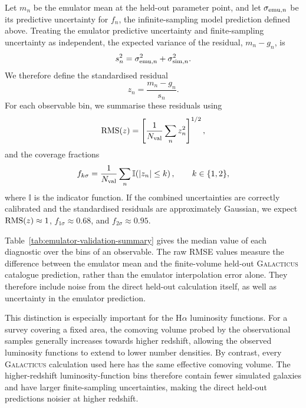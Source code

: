 \documentclass[twocolumn, apj, numberedappendix, iop]{openjournal}
\newcommand{\galacticus}{\textsc{Galacticus}\xspace}
\newcommand{\ha}{H$\alpha$}
\begin{document}
Let $m_n$ be the emulator mean at the held-out parameter point, and let
$\sigma_{{\rm emu},n}$ be its predictive uncertainty for $f_n$, the
infinite-sampling model prediction defined above. Treating the emulator
predictive uncertainty and finite-sampling uncertainty as independent, the
expected variance of the residual, $m_n - g_n$, is
\begin{equation}
  s_n^2
  =
  \sigma_{{\rm emu},n}^2
  +
  \sigma_{{\rm sim},n}^2.
\end{equation}
We therefore define the standardised residual
\begin{equation}
  z_n = \frac{m_n-g_n}{s_n}.
\end{equation}
For each observable bin, we summarise these residuals using
\begin{equation}
  {\rm RMS}(z)
  =
  \left[
    \frac{1}{N_{\rm val}}
    \sum_n z_n^2
  \right]^{1/2},
\end{equation}
and the coverage fractions
\begin{equation}
  f_{k\sigma}
  =
  \frac{1}{N_{\rm val}}
  \sum_n
  \mathbb{I}\!\left(\lvert z_n\rvert \leq k\right),
  \qquad k\in\{1,2\},
\end{equation}
where $\mathbb{I}$ is the indicator function. If the combined uncertainties
are correctly calibrated and the standardised residuals are approximately
Gaussian, we expect ${\rm RMS}(z)\approx1$, $f_{1\sigma}\approx0.68$, and
$f_{2\sigma}\approx0.95$.

Table~\ref{tab:emulator-validation-summary} gives the median value of each
diagnostic over the bins of an observable. The raw RMSE values measure the
difference between the emulator mean and the finite-volume held-out
\galacticus{} catalogue prediction, rather than the emulator interpolation error
alone. They therefore include noise from the direct held-out calculation itself,
as well as uncertainty in the emulator prediction.

This distinction is especially important for the \ha{} luminosity functions. For
a survey covering a fixed area, the comoving volume probed by the observational
samples generally increases towards higher redshift, allowing the observed
luminosity functions to extend to lower number densities. By contrast, every
\galacticus{} calculation used here has the same effective comoving volume. The
higher-redshift luminosity-function bins therefore contain fewer simulated
galaxies and have larger finite-sampling uncertainties, making the direct
held-out predictions noisier at higher redshift.
\end{document}
